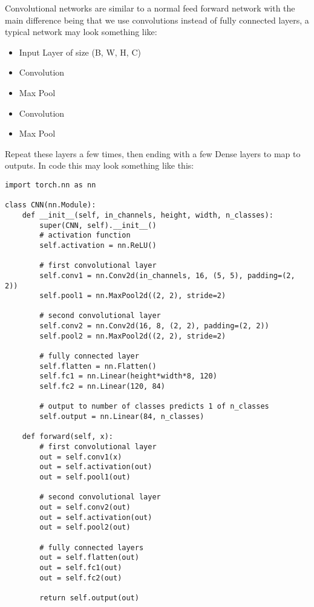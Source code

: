 \documentclass[11pt]{article}
\begin{document}
Convolutional networks are similar to a normal feed forward network with the main difference being that we use convolutions instead of fully connected layers, a typical network may look something like:
\begin{itemize}
\item Input Layer of size (B, W, H, C)
\item Convolution
\item Max Pool
\item Convolution
\item Max Pool
\end{itemize}
Repeat these layers a few times, then ending with a few Dense layers to map to outputs. In code this may look something like this:
\begin{verbatim}
import torch.nn as nn

class CNN(nn.Module):
    def __init__(self, in_channels, height, width, n_classes):
        super(CNN, self).__init__()
        # activation function
        self.activation = nn.ReLU()

        # first convolutional layer
        self.conv1 = nn.Conv2d(in_channels, 16, (5, 5), padding=(2, 2))
        self.pool1 = nn.MaxPool2d((2, 2), stride=2)

        # second convolutional layer
        self.conv2 = nn.Conv2d(16, 8, (2, 2), padding=(2, 2))
        self.pool2 = nn.MaxPool2d((2, 2), stride=2)

        # fully connected layer
        self.flatten = nn.Flatten()
        self.fc1 = nn.Linear(height*width*8, 120)
        self.fc2 = nn.Linear(120, 84)

        # output to number of classes predicts 1 of n_classes
        self.output = nn.Linear(84, n_classes)

    def forward(self, x):
        # first convolutional layer
        out = self.conv1(x)
        out = self.activation(out)
        out = self.pool1(out)

        # second convolutional layer
        out = self.conv2(out)
        out = self.activation(out)
        out = self.pool2(out)

        # fully connected layers
        out = self.flatten(out)
        out = self.fc1(out)
        out = self.fc2(out)

        return self.output(out)

\end{verbatim}
\end{document}
